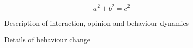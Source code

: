 \documentclass[11pt]{article}
\begin{document}
\begin{equation}
a^2 + b^2 = c^2
\tag*{Equation 1}
\end{equation}

\begin{figure}[htbp] 
\begin{center} 
 \caption{Description of interaction, opinion and behaviour dynamics} 
\label{fig:mechanisms} 
\end{center} 
\end{figure} %


\begin{figure}[htbp] 
\begin{center} 
 \caption{Details of behaviour change} \label{fig:mechanisms_behaviour} 
\end{center} 
\end{figure} %
\end{document}
